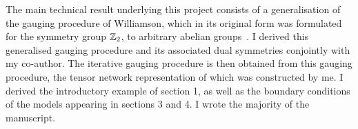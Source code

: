The main technical result underlying this project consists of a generalisation of the gauging procedure of Williamson, which in its original form was formulated for the symmetry group $\mathbb Z_2$, to arbitrary abelian groups~\cite{Williamson2016b}. I derived this generalised gauging procedure and its associated dual symmetries conjointly with my co-author. The iterative gauging procedure is then obtained from this gauging procedure, the tensor network representation of which was constructed by me. I derived the introductory example of section 1, as well as the boundary conditions of the models appearing in sections 3 and 4. I wrote the majority of the manuscript.
%
